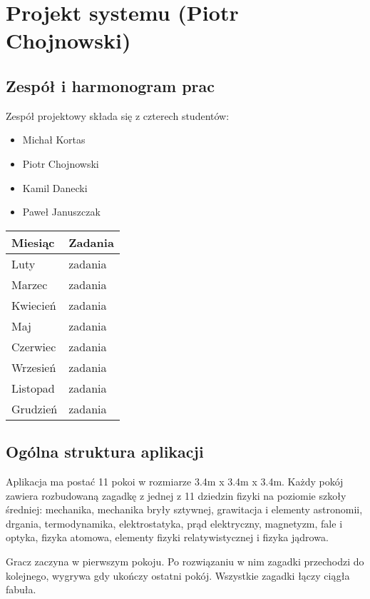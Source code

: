 \chapter{Projekt systemu (Piotr Chojnowski)}
\label{chap:project}

\section{Zespół i harmonogram prac}
Zespół projektowy składa się z czterech studentów:

\begin{itemize}
    \item Michał Kortas
    \item Piotr Chojnowski
    \item Kamil Danecki
    \item Paweł Januszczak
\end{itemize}
\hfill
\newline
\begin{tabular}{ |p{3cm}|p{8cm}|  }
 \hline
 \textbf{Miesiąc} & \textbf{Zadania} \\ 
 \hline
 Luty & zadania \\
 \hline
 Marzec & zadania \\   
 \hline
 Kwiecień & zadania \\ 
 \hline
 Maj & zadania \\
 \hline
 Czerwiec & zadania \\  
 \hline
 Wrzesień & zadania \\ 
 \hline
 Listopad & zadania \\ 
 \hline
 Grudzień & zadania \\
 \hline
\end{tabular}

\section{Ogólna struktura aplikacji}
Aplikacja ma postać 11 pokoi w rozmiarze 3.4m x 3.4m x 3.4m. Każdy pokój zawiera rozbudowaną zagadkę z jednej z 11 dziedzin fizyki na poziomie szkoły średniej: mechanika, mechanika bryły sztywnej, grawitacja i elementy astronomii, drgania, termodynamika, elektrostatyka, prąd elektryczny, magnetyzm, fale i optyka, fizyka atomowa, elementy fizyki relatywistycznej i fizyka jądrowa.

Gracz zaczyna w pierwszym pokoju. Po rozwiązaniu w nim zagadki przechodzi do kolejnego, wygrywa gdy ukończy ostatni pokój. Wszystkie zagadki łączy ciągła fabuła.

